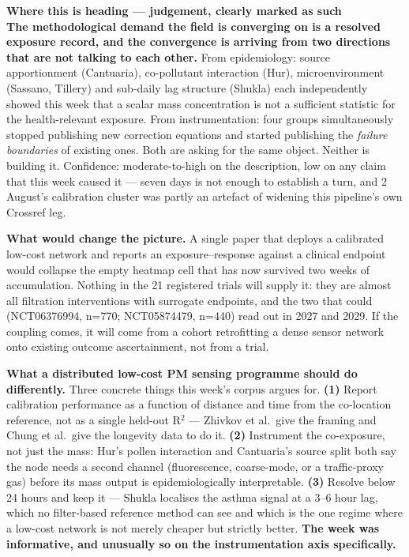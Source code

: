 \documentclass[10pt]{article}
\begin{document}
\vspace{3mm}
\begin{keybox}
{\sffamily\bfseries\footnotesize\color{Deep}Where this is heading --- judgement, clearly
marked as such}\\[1.2mm]
\footnotesize
\textbf{The methodological demand the field is converging on is a resolved exposure
record, and the convergence is arriving from two directions that are not talking to each
other.} From epidemiology: source apportionment (Cantuaria), co-pollutant interaction
(Hur), microenvironment (Sassano, Tillery) and sub-daily lag structure (Shukla) each
independently showed this week that a scalar mass concentration is not a sufficient
statistic for the health-relevant exposure. From instrumentation: four groups
simultaneously stopped publishing new correction equations and started publishing the
\emph{failure boundaries} of existing ones. Both are asking for the same object. Neither
is building it. Confidence: moderate-to-high on the description, low on any claim that
this week caused it --- seven days is not enough to establish a turn, and 2 August's
calibration cluster was partly an artefact of widening this pipeline's own Crossref leg.

\vspace{1.4mm}
\textbf{What would change the picture.} A single paper that deploys a calibrated low-cost
network and reports an exposure--response against a clinical endpoint would collapse the
empty heatmap cell that has now survived two weeks of accumulation. Nothing in the 21
registered trials will supply it: they are almost all filtration interventions with
surrogate endpoints, and the two that could (NCT06376994, n=770; NCT05874479, n=440) read
out in 2027 and 2029. If the coupling comes, it will come from a cohort retrofitting a
dense sensor network onto existing outcome ascertainment, not from a trial.

\vspace{1.4mm}
\textbf{What a distributed low-cost PM sensing programme should do differently.} Three
concrete things this week's corpus argues for. \textbf{(1)} Report calibration
performance as a function of distance and time from the co-location reference, not as a
single held-out R$^2$ --- Zhivkov et al.\ give the framing and Chung et al.\ give the
longevity data to do it. \textbf{(2)} Instrument the co-exposure, not just the mass:
Hur's pollen interaction and Cantuaria's source split both say the node needs a second
channel (fluorescence, coarse-mode, or a traffic-proxy gas) before its mass output is
epidemiologically interpretable. \textbf{(3)} Resolve below 24 hours and keep it ---
Shukla localises the asthma signal at a 3--6 hour lag, which no filter-based reference
method can see and which is the one regime where a low-cost network is not merely cheaper
but strictly better. \textbf{The week was informative, and unusually so on the
instrumentation axis specifically.}
\end{keybox}
\end{document}
